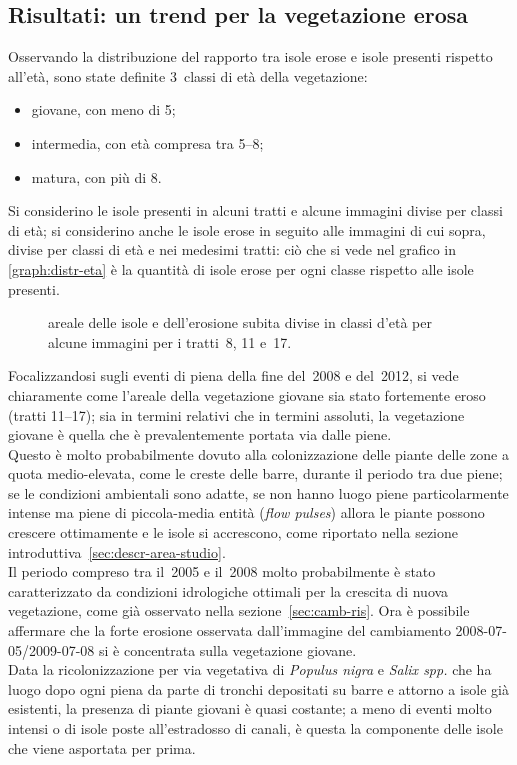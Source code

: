 \subsection{Risultati: un trend per la vegetazione erosa}
Osservando la distribuzione del rapporto tra isole erose e isole presenti rispetto all'età, sono state definite 3~classi di età della vegetazione:
%
\begin{itemize}
	\item giovane, con meno di \SI{5}{\anni};
	\item intermedia, con età compresa tra \SIrange[range-phrase={ e }]{5}{8}{\anni};
	\item matura, con più di \SI{8}{\anni}.
\end{itemize}
%
Si considerino le isole presenti in alcuni tratti e alcune immagini divise per classi di età; si considerino anche le isole erose in seguito alle immagini di cui sopra, divise per classi di età e nei medesimi tratti: ciò che si vede nel grafico in \vref{graph:distr-eta} è la quantità di isole erose per ogni classe rispetto alle isole presenti. 
%
\begin{figure}
	\centering
	
	\caption[areale delle isole e dell'erosione subita divise in classi d'età per i tratti~8, 11 e~17]{areale delle isole e dell'erosione subita divise in classi d'età per alcune immagini per i tratti~8, 11 e~17.}
	\label{graph:distr-eta}
\end{figure}
%
Focalizzandosi sugli eventi di piena della fine del~2008 e del~2012, si vede chiaramente come l'areale della vegetazione giovane sia stato fortemente eroso (tratti \numrange[range-phrase={ e }]{11}{17});
sia in termini relativi che in termini assoluti, la vegetazione giovane è quella che è prevalentemente portata via dalle piene.
\\
Questo è molto probabilmente dovuto alla colonizzazione delle piante delle zone a quota medio-elevata, come le creste delle barre, durante il periodo tra due piene; 
se le condizioni ambientali sono adatte, se non hanno luogo piene particolarmente intense ma piene di piccola-media entità (\emph{flow pulses}) allora le piante possono crescere ottimamente e le isole si accrescono, come riportato nella sezione introduttiva~\ref{sec:descr-area-studio}.
\\
Il periodo compreso tra il~2005 e il~2008 molto probabilmente è stato caratterizzato da condizioni idrologiche ottimali per la crescita di nuova vegetazione, come già osservato nella sezione~\ref{sec:camb-ris}.
Ora è possibile affermare che la forte erosione osservata dall'immagine del cambiamento 2008-07-05/2009-07-08 si è concentrata sulla vegetazione giovane.
\\
Data la ricolonizzazione per via vegetativa di \emph{Populus nigra} e \emph{Salix spp.} che ha luogo dopo ogni piena da parte di tronchi depositati su barre e attorno a isole già esistenti, la presenza di piante giovani è quasi costante; a meno di eventi molto intensi o di isole poste all'estradosso di canali, è questa la componente delle isole che viene asportata per prima.

